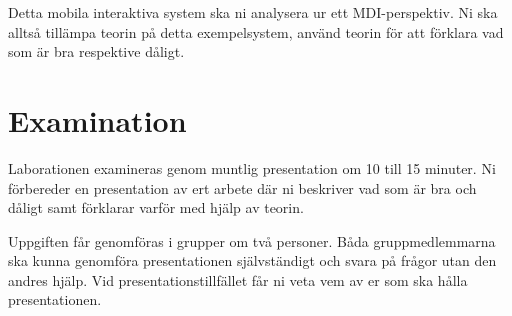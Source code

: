 \documentclass[a4paper,logo,nocourse]{miunasgn}
\begin{document}
Detta mobila interaktiva system ska ni analysera ur ett MDI-perspektiv.
Ni ska alltså tillämpa teorin \cite{Sharp2011idb} på detta exempelsystem, 
använd teorin för att förklara vad som är bra respektive dåligt.


\section{Examination}
\label{sec:Examination}
Laborationen examineras genom muntlig presentation om 10 till 15 minuter.
Ni förbereder en presentation av ert arbete där ni beskriver vad som är bra och 
dåligt samt förklarar varför med hjälp av teorin.

Uppgiften får genomföras i grupper om två personer.
Båda gruppmedlemmarna ska kunna genomföra presentationen självständigt och 
svara på frågor utan den andres hjälp.
Vid presentationstillfället får ni veta vem av er som ska hålla presentationen.


\printbibliography
\end{document}
